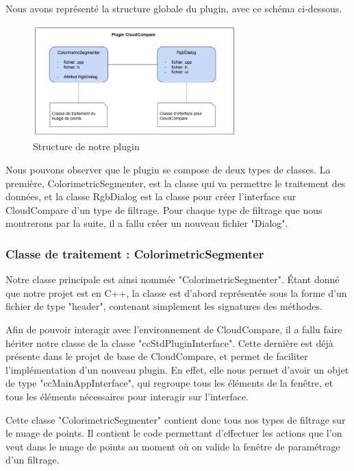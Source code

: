 \documentclass[12pt,titlepage,french]{article}
\begin{document}
Nous avons représenté la structure globale du plugin, avec ce schéma ci-dessous.

\begin{figure}[H]
\center
  \includegraphics[width=0.7\textwidth]{./img/architecture_plugin.PNG}
  \caption{\label{} Structure de notre plugin}
\end{figure}

Nous pouvons observer que le plugin se compose de deux types de classes. La première, ColorimetricSegmenter, est la classe qui va permettre le traitement des données, et la classe RgbDialog est la classe pour créer l'interface sur CloudCompare d'un type de filtrage. Pour chaque type de filtrage que nous montrerons par la suite, il a fallu créer un nouveau fichier "Dialog".

\subsubsection{Classe de traitement : ColorimetricSegmenter}

Notre classe principale est ainsi nommée "ColorimetricSegmenter". Étant donné que notre projet est en C++, la classe est d'abord représentée sous la forme d'un fichier de type "header", contenant simplement les signatures des méthodes. \newline

Afin de pouvoir interagir avec l'environnement de CloudCompare, il a fallu faire hériter notre classe de la classe "ccStdPluginInterface". Cette dernière est déjà présente dans le projet de base de CloudCompare, et permet de faciliter l'implémentation d'un nouveau plugin. En effet, elle nous permet d'avoir un objet de type "ccMainAppInterface", qui regroupe tous les éléments de la fenêtre, et tous les éléments nécessaires pour interagir sur l'interface. \newline

Cette classe "ColorimetricSegmenter" contient donc tous nos types de filtrage sur le nuage de points. Il contient le code permettant d'effectuer les actions que l'on veut dans le nuage de points au moment où on valide la fenêtre de paramétrage d'un filtrage. \newline
\end{document}
